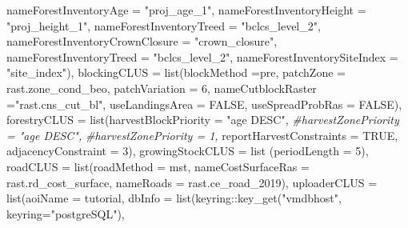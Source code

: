 \documentclass[
]{article}
\newenvironment{Shaded}{\begin{snugshade}}{\end{snugshade}}
\newcommand{\AttributeTok}[1]{\textcolor[rgb]{0.77,0.63,0.00}{#1}}
\newcommand{\CommentTok}[1]{\textcolor[rgb]{0.56,0.35,0.01}{\textit{#1}}}
\newcommand{\ConstantTok}[1]{\textcolor[rgb]{0.00,0.00,0.00}{#1}}
\newcommand{\DecValTok}[1]{\textcolor[rgb]{0.00,0.00,0.81}{#1}}
\newcommand{\FunctionTok}[1]{\textcolor[rgb]{0.00,0.00,0.00}{#1}}
\newcommand{\NormalTok}[1]{#1}
\newcommand{\SpecialCharTok}[1]{\textcolor[rgb]{0.00,0.00,0.00}{#1}}
\newcommand{\StringTok}[1]{\textcolor[rgb]{0.31,0.60,0.02}{#1}}
\begin{document}
\begin{Shaded}
\begin{Highlighting}[]
                           \AttributeTok{nameForestInventoryAge =} \StringTok{"proj\_age\_1"}\NormalTok{,}
                           \AttributeTok{nameForestInventoryHeight =} \StringTok{"proj\_height\_1"}\NormalTok{,}
                           \AttributeTok{nameForestInventoryTreed =} \StringTok{"bclcs\_level\_2"}\NormalTok{,}
                           \AttributeTok{nameForestInventoryCrownClosure =} \StringTok{"crown\_closure"}\NormalTok{,}
                           \AttributeTok{nameForestInventoryTreed =} \StringTok{"bclcs\_level\_2"}\NormalTok{,}
                           \AttributeTok{nameForestInventorySiteIndex =} \StringTok{"site\_index"}\NormalTok{),}
  \AttributeTok{blockingCLUS =} \FunctionTok{list}\NormalTok{(}\AttributeTok{blockMethod =}\StringTok{\textquotesingle{}pre\textquotesingle{}}\NormalTok{, }
                      \AttributeTok{patchZone =} \StringTok{\textquotesingle{}rast.zone\_cond\_beo\textquotesingle{}}\NormalTok{,}
                      \AttributeTok{patchVariation =} \DecValTok{6}\NormalTok{,}
                      \AttributeTok{nameCutblockRaster =}\StringTok{"rast.cns\_cut\_bl"}\NormalTok{,}
                      \AttributeTok{useLandingsArea =} \ConstantTok{FALSE}\NormalTok{, }
                      \AttributeTok{useSpreadProbRas =} \ConstantTok{FALSE}\NormalTok{),}
  \AttributeTok{forestryCLUS =} \FunctionTok{list}\NormalTok{(}\AttributeTok{harvestBlockPriority =} \StringTok{"age DESC"}\NormalTok{, }
                      \CommentTok{\#harvestZonePriority = "age DESC",}
                      \CommentTok{\#harvestZonePriority = 1,}
                      \AttributeTok{reportHarvestConstraints =} \ConstantTok{TRUE}\NormalTok{,}
                      \AttributeTok{adjacencyConstraint =} \DecValTok{3}\NormalTok{),}
  \AttributeTok{growingStockCLUS =} \FunctionTok{list}\NormalTok{ (}\AttributeTok{periodLength =} \DecValTok{5}\NormalTok{),}
  \AttributeTok{roadCLUS =} \FunctionTok{list}\NormalTok{(}\AttributeTok{roadMethod =} \StringTok{\textquotesingle{}mst\textquotesingle{}}\NormalTok{, }
                  \AttributeTok{nameCostSurfaceRas =} \StringTok{\textquotesingle{}rast.rd\_cost\_surface\textquotesingle{}}\NormalTok{, }
                  \AttributeTok{nameRoads =}  \StringTok{\textquotesingle{}rast.ce\_road\_2019\textquotesingle{}}\NormalTok{),}
  \AttributeTok{uploaderCLUS =} \FunctionTok{list}\NormalTok{(}\AttributeTok{aoiName =} \StringTok{\textquotesingle{}tutorial\textquotesingle{}}\NormalTok{, }
                      \AttributeTok{dbInfo  =} \FunctionTok{list}\NormalTok{(keyring}\SpecialCharTok{::}\FunctionTok{key\_get}\NormalTok{(}\StringTok{"vmdbhost"}\NormalTok{, }\AttributeTok{keyring=}\StringTok{"postgreSQL"}\NormalTok{), }

\end{Highlighting}
\end{Shaded}
\end{document}
